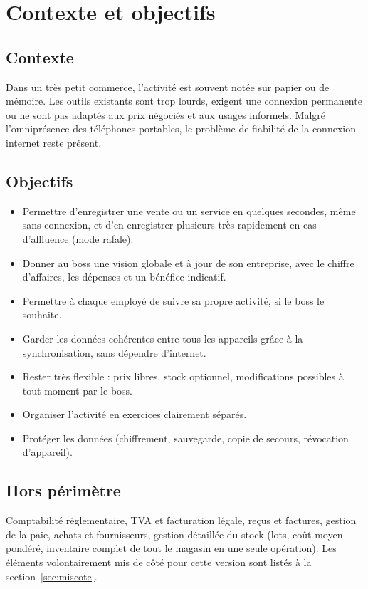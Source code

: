 \documentclass[11pt,a4paper]{article}
\begin{document}
	\section{Contexte et objectifs}
	\subsection{Contexte}
	Dans un très petit commerce, l'activité est souvent notée sur papier ou de mémoire. Les outils existants sont trop lourds, exigent une connexion permanente ou ne sont pas adaptés aux prix négociés et aux usages informels. Malgré l'omniprésence des téléphones portables, le problème de fiabilité de la connexion internet reste présent.

	\subsection{Objectifs}
	\begin{itemize}[leftmargin=*]
		\item Permettre d'enregistrer une vente ou un service en quelques secondes, même sans connexion, et d'en enregistrer plusieurs très rapidement en cas d'affluence (mode rafale).
		\item Donner au boss une vision globale et à jour de son entreprise, avec le chiffre d'affaires, les dépenses et un bénéfice indicatif.
		\item Permettre à chaque employé de suivre sa propre activité, si le boss le souhaite.
		\item Garder les données cohérentes entre tous les appareils grâce à la synchronisation, sans dépendre d'internet.
		\item Rester très flexible : prix libres, stock optionnel, modifications possibles à tout moment par le boss.
		\item Organiser l'activité en exercices clairement séparés.
		\item Protéger les données (chiffrement, sauvegarde, copie de secours, révocation d'appareil).
	\end{itemize}

	\subsection{Hors périmètre}
	Comptabilité réglementaire, TVA et facturation légale, reçus et factures, gestion de la paie, achats et fournisseurs, gestion détaillée du stock (lots, coût moyen pondéré, inventaire complet de tout le magasin en une seule opération). Les éléments volontairement mis de côté pour cette version sont listés à la section~\ref{sec:miscote}.
\end{document}
